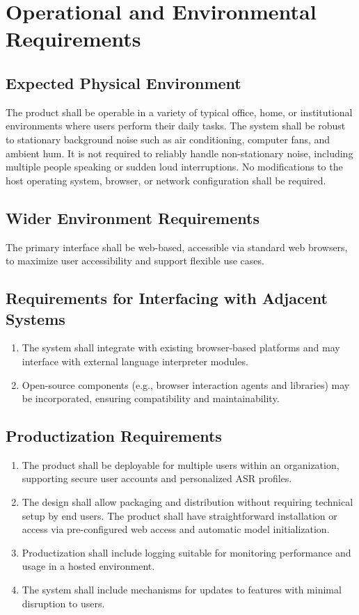 \documentclass[11pt]{article}
\begin{document}
\section{Operational and Environmental Requirements}
\subsection{Expected Physical Environment}
The product shall be operable in a variety of typical office, home, or institutional environments where users perform their daily tasks. The system shall be robust to stationary background noise such as air conditioning, computer fans, and ambient hum. It is not required to reliably handle non-stationary noise, including multiple people speaking or sudden loud interruptions. No modifications to the host operating system, browser, or network configuration shall be required.
\subsection{Wider Environment Requirements}
The primary interface shall be web-based, accessible via standard web browsers, to maximize user accessibility and support flexible use cases.
\subsection{Requirements for Interfacing with Adjacent Systems}
\begin{enumerate}
    \item The system shall integrate with existing browser-based platforms and may interface with external language interpreter modules.
    \item Open-source components (e.g., browser interaction agents and libraries) may be incorporated, ensuring compatibility and maintainability.
\end{enumerate}

\subsection{Productization Requirements}
\begin{enumerate}
    \item The product shall be deployable for multiple users within an organization, supporting secure user accounts and personalized ASR profiles.
    \item The design shall allow packaging and distribution without requiring technical setup by end users. The product shall have straightforward installation or access via pre-configured web access and automatic model initialization.
    \item Productization shall include logging suitable for monitoring performance and usage in a hosted environment.
    \item The system shall include mechanisms for updates to features with minimal disruption to users.
\end{enumerate}
\end{document}
